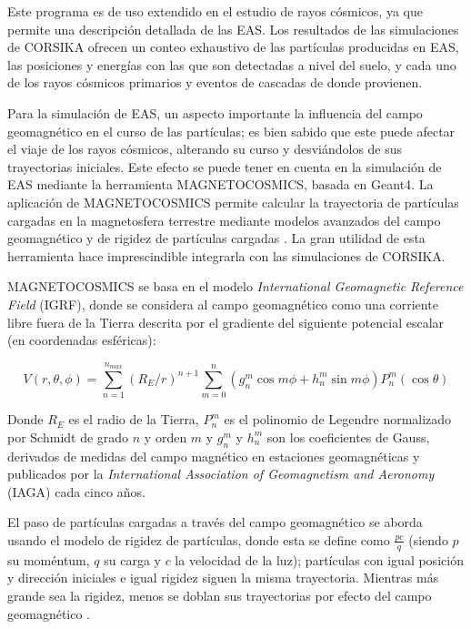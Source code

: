 \documentclass[12pt]{report}
\begin{document}
Este programa es de uso extendido en el estudio de rayos cósmicos, ya que permite una descripción detallada de las EAS. Los resultados de las simulaciones de CORSIKA ofrecen un conteo exhaustivo de las partículas producidas en EAS, las posiciones y energías con las que son detectadas a nivel del suelo, y cada uno de los rayos cósmicos primarios y eventos de cascadas de donde provienen.

Para la simulación de EAS, un aspecto importante la influencia del campo geomagnético en el curso de las partículas; es bien sabido que este puede afectar el viaje de los rayos cósmicos, alterando su curso y desviándolos de sus trayectorias iniciales. Este efecto se puede tener en cuenta en la simulación de EAS mediante la herramienta MAGNETOCOSMICS, basada en Geant4. La aplicación de MAGNETOCOSMICS permite calcular la trayectoria de partículas cargadas en la magnetosfera terrestre mediante modelos avanzados del campo geomagnético y de rigidez de partículas cargadas \cite{magnetocosmics}. La gran utilidad de esta herramienta hace imprescindible integrarla con las simulaciones de CORSIKA.

MAGNETOCOSMICS se basa en el modelo \textit{International Geomagnetic Reference Field} (IGRF), donde se considera al campo geomagnético como una corriente libre fuera de la Tierra descrita por el gradiente del siguiente potencial escalar (en coordenadas esféricas):

\begin{equation}
V(r, \theta, \phi)=\sum_{n=1}^{n_{max}}\left(R_{E} / r\right)^{n+1} \sum_{m=0}^{n}\left(g_{n}^{m} \cos m \phi+h_{n}^{m} \sin m \phi\right) P_{n}^{m}(\cos \theta)
\end{equation}

Donde $R_E$ es el radio de la Tierra, $P_n^m$ es el polinomio de Legendre normalizado por Schmidt de grado $n$ y orden $m$ y $g_n^m$ y $h_n^m$ son los coeficientes de Gauss, derivados de medidas del campo magnético en estaciones geomagnéticas y publicados por la \textit{International Association of Geomagnetism and Aeronomy} (IAGA) cada cinco años.

El paso de partículas cargadas a través del campo geomagnético se aborda usando el modelo de rigidez de partículas, donde esta se define como $\frac{pc}{q}$ (siendo $p$ su moméntum, $q$ su carga y $c$ la velocidad de la luz); partículas con igual posición y dirección iniciales e igual rigidez siguen la misma trayectoria. Mientras más grande sea la rigidez, menos se doblan sus trayectorias por efecto del campo geomagnético \cite{magnetocosmics}.
\end{document}
